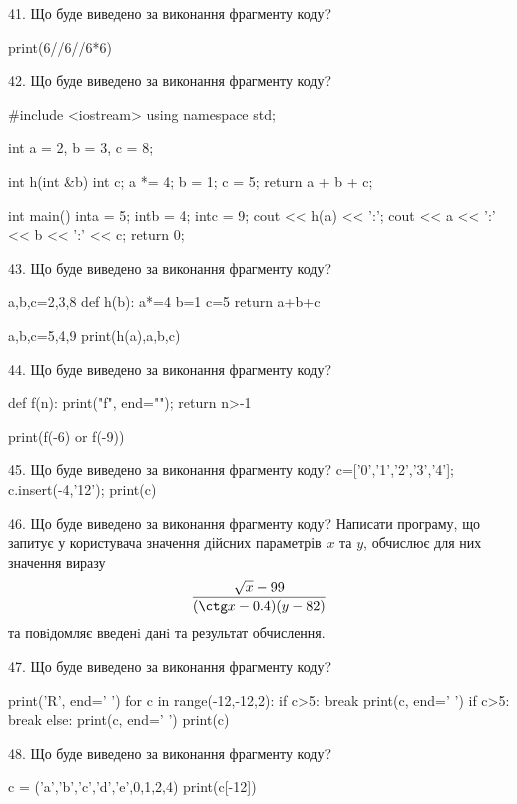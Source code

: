 \documentclass[11pt]{article}
\begin{document}

41. Що буде виведено за виконання фрагменту коду?

print(6//6//6*6)


42. Що буде виведено за виконання фрагменту коду?

#include <iostream>
using namespace std;

int a = 2, b = 3, c = 8;

int h(int &b){
int c;    a *= 4;
    b = 1;
    c = 5;
    return a + b + c;
}

int main(){
    inta = 5;
    intb = 4;
    intc = 9;
    cout << h(a) << ':';
    cout << a << ':' << b << ':' << c;
    return 0; 
}


43. Що буде виведено за виконання фрагменту коду?

a,b,c=2,3,8
def h(b):
    a*=4
    b=1
    c=5
    return a+b+c

a,b,c=5,4,9
print(h(a),a,b,c)


44. Що буде виведено за виконання фрагменту коду?

def f(n):
    print("f", end="");
    return n>-1

print(f(-6) or f(-9))


45. Що буде виведено за виконання фрагменту коду?
c=['0','1','2','3','4']; c.insert(-4,'12'); print(c)

46. Що буде виведено за виконання фрагменту коду?
Написати програму, що запитує у користувача значення дійсних параметрів $x$ та $y$, обчислює для них значення виразу 
$$\frac{\sqrt x - 99}{(\ctg x - 0.4) (y - 82)}$$ 
та повiдомляє введенi данi та результат обчислення.



47. Що буде виведено за виконання фрагменту коду?

print('R', end=' ')
for c in range(-12,-12,2):
    if c>5:
        break
        print(c, end=' ')
    if c>5:
        break
    else:
        print(c, end=' ')
    print(c)


48. Що буде виведено за виконання фрагменту коду?

c = ('a','b','c','d','e',0,1,2,4)
print(c[-12])
\end{document}
